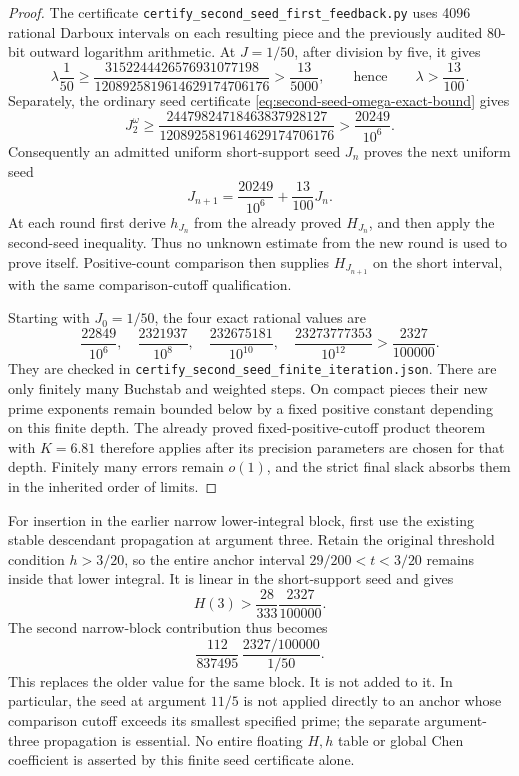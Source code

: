 \documentclass[11pt]{article}
\begin{document}
\begin{proof}
The certificate \texttt{certify\_second\_seed\_first\_feedback.py}
uses 4096 rational Darboux intervals on each resulting piece and
the previously audited 80-bit outward logarithm arithmetic. At
$J=1/50$, after division by five, it gives
\[
 \lambda\frac1{50}\ge
 \frac{3152244426576931077198}{1208925819614629174706176}
 >\frac{13}{5000},
 \qquad\text{hence}\qquad \lambda>\frac{13}{100}.
\]
Separately, the ordinary seed certificate
\eqref{eq:second-seed-omega-exact-bound} gives
\[
 J_2^\omega\ge
 \frac{24479824718463837928127}{1208925819614629174706176}
 >\frac{20249}{10^6}.
\]
Consequently an admitted uniform short-support seed $J_n$ proves
the next uniform seed
\[
 J_{n+1}=\frac{20249}{10^6}+\frac{13}{100}J_n.
\]
At each round first derive $h_{J_n}$ from the already proved
$H_{J_n}$, and then apply the second-seed inequality. Thus no
unknown estimate from the new round is used to prove itself.
Positive-count comparison then supplies $H_{J_{n+1}}$ on the
short interval, with the same comparison-cutoff qualification.

Starting with $J_0=1/50$, the four exact rational values are
\[
 \frac{22849}{10^6},\quad
 \frac{2321937}{10^8},\quad
 \frac{232675181}{10^{10}},\quad
 \frac{23273777353}{10^{12}}
 >\frac{2327}{100000}.
\]
They are checked in
\texttt{certify\_second\_seed\_finite\_iteration.json}.
There are only finitely many Buchstab and weighted steps. On
compact pieces their new prime exponents remain bounded below by
a fixed positive constant depending on this finite depth. The
already proved fixed-positive-cutoff product theorem with $K=6.81$
therefore applies after its precision parameters are chosen for
that depth. Finitely many errors remain $o(1)$, and the strict
final slack absorbs them in the inherited order of limits.
\end{proof}

For insertion in the earlier narrow lower-integral block, first
use the existing stable descendant propagation at argument three.
Retain the original threshold condition $h>3/20$, so the entire
anchor interval $29/200<t<3/20$ remains inside that lower integral.
It is linear in the short-support seed and gives
\[
 H(3)>\frac{28}{333}\frac{2327}{100000}.
\]
The second narrow-block contribution thus becomes
\[
 \frac{112}{837495}\,
 \frac{2327/100000}{1/50}.
\]
This replaces the older value for the same block. It is not added
to it. In particular, the seed at argument $11/5$ is not applied
directly to an anchor whose comparison cutoff exceeds its smallest
specified prime; the separate argument-three propagation is
essential. No entire floating $H,h$ table or global Chen coefficient
is asserted by this finite seed certificate alone.
\end{document}
